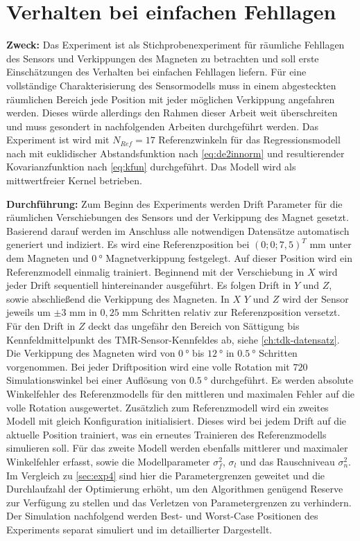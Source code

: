 %

\section{Verhalten bei einfachen Fehllagen}\label{sec:exp5}

\textbf{Zweck:} Das Experiment ist als Stichprobenexperiment für räumliche Fehllagen des Sensors und Verkippungen des Magneten zu betrachten und soll erste Einschätzungen des Verhalten bei einfachen Fehllagen liefern. Für eine vollständige Charakterisierung des Sensormodells muss in einem abgesteckten räumlichen Bereich jede Position mit jeder möglichen Verkippung angefahren werden. Dieses würde allerdings den Rahmen dieser Arbeit weit überschreiten und muss gesondert in nachfolgenden Arbeiten durchgeführt werden. Das Experiment ist wird mit $N_{Ref} = 17$ Referenzwinkeln für das Regressionsmodell nach mit euklidischer Abstandsfunktion nach \autoref{eq:de2innorm} und resultierender Kovarianzfunktion nach \autoref{eq:kfun} durchgeführt. Das Modell wird als mittwertfreier Kernel betrieben.

\textbf{Durchführung:} Zum Beginn des Experiments werden Drift Parameter für die räumlichen Verschiebungen des Sensors und der Verkippung des Magnet gesetzt. Basierend darauf werden im Anschluss alle notwendigen Datensätze automatisch generiert und indiziert. Es wird eine Referenzposition bei $(0;0;7,5)^T$ mm unter dem Magneten und $\SI{0}{\degree}$ Magnetverkippung festgelegt. Auf dieser Position wird ein Referenzmodell einmalig trainiert. Beginnend mit der Verschiebung in $X$ wird jeder Drift sequentiell hintereinander ausgeführt. Es folgen Drift in $Y$ und $Z$, sowie abschließend die Verkippung des Magneten. In $X$ $Y$ und $Z$ wird der Sensor jeweils um $\pm 3$ mm in $0,25$ mm Schritten relativ zur Referenzposition versetzt. Für den Drift in $Z$ deckt das ungefähr den Bereich von Sättigung bis Kennfeldmittelpunkt des TMR-Sensor-Kennfeldes ab, siehe \autoref{ch:tdk-datensatz}. Die Verkippung des Magneten wird von $\SI{0}{\degree}$ bis $\SI{12}{\degree}$ in $\SI{0,5}{\degree}$ Schritten vorgenommen. Bei jeder Driftposition wird eine volle Rotation mit $720$ Simulationswinkel bei einer Auflösung von $\SI{0,5}{\degree}$ durchgeführt. Es werden absolute Winkelfehler des Referenzmodells für den mittleren und maximalen Fehler auf die volle Rotation ausgewertet. Zusätzlich zum Referenzmodell wird ein zweites Modell mit gleich Konfiguration initialisiert. Dieses wird bei jedem Drift auf die aktuelle Position trainiert, was ein erneutes Trainieren des Referenzmodells simulieren soll. Für das zweite Modell werden ebenfalls mittlerer und maximaler Winkelfehler erfasst, sowie die Modellparameter $\sigma_f^2$, $\sigma_l$ und das Rauschniveau $\sigma_n^2$. Im Vergleich zu \autoref{sec:exp4} sind hier die Parametergrenzen geweitet und die Durchlaufzahl der Optimierung erhöht, um den Algorithmen genügend Reserve zur Verfügung zu stellen und das Verletzen von Parametergrenzen zu verhindern. Der Simulation nachfolgend werden Best- und Worst-Case Positionen des Experiments separat simuliert und im detaillierter Dargestellt.


